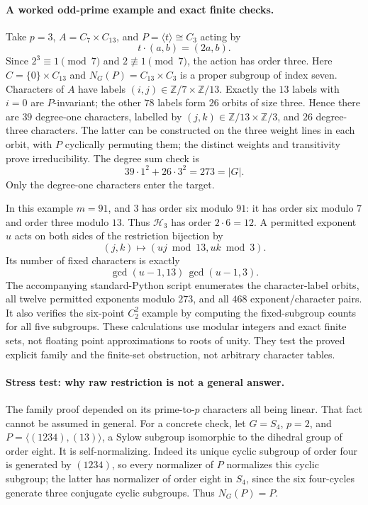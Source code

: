 \documentclass[11pt]{article}
\begin{document}
\paragraph{A worked odd-prime example and exact finite checks.}
Take $p=3$, $A=C_7\times C_{13}$, and $P=\langle t\rangle\cong C_3$
acting by
\[
 t\cdot(a,b)=(2a,b).
\]
Since $2^3\equiv1\pmod7$ and $2\not\equiv1\pmod7$, the action
has order three. Here $C=\{0\}\times C_{13}$ and
$N_G(P)=C_{13}\times C_3$ is a proper subgroup of index seven.
Characters of $A$ have labels $(i,j)\in\mathbb Z/7\times\mathbb Z/13$.
Exactly the $13$ labels with $i=0$ are $P$-invariant; the other $78$
labels form $26$ orbits of size three. Hence there are $39$ degree-one
characters, labelled by $(j,k)\in\mathbb Z/13\times\mathbb Z/3$,
and $26$ degree-three characters. The latter can be constructed on the
three weight lines in each orbit, with $P$ cyclically permuting them;
the distinct weights and transitivity prove irreducibility. The degree
sum check is
\[
 39\cdot1^2+26\cdot3^2=273=|G|.
\]
Only the degree-one characters enter the target.

In this example $m=91$, and $3$ has order six modulo $91$: it has
order six modulo $7$ and order three modulo $13$. Thus $\mathcal H_3$
has order $2\cdot6=12$. A permitted exponent $u$ acts on both sides
of the restriction bijection by
\[
 (j,k)\longmapsto(uj\bmod13,uk\bmod3).
\]
Its number of fixed characters is exactly
\begin{equation}\label{ra495:examplefixed}
 \gcd(u-1,13)\,\gcd(u-1,3).
\end{equation}
The accompanying standard-Python script enumerates the character-label
orbits, all twelve permitted exponents modulo $273$, and all $468$
exponent/character pairs. It also verifies the six-point $C_2^2$ example
by computing the fixed-subgroup counts for all five subgroups. These
calculations use modular integers and exact finite sets, not floating
point approximations to roots of unity. They test the proved explicit
family and the finite-set obstruction, not arbitrary character tables.

\paragraph{Stress test: why raw restriction is not a general answer.}
The family proof depended on its prime-to-$p$ characters all being linear.
That fact cannot be assumed in general. For a concrete check, let
$G=S_4$, $p=2$, and
$P=\langle(1234),(13)\rangle$, a Sylow subgroup isomorphic to the
dihedral group of order eight. It is self-normalizing. Indeed its unique
cyclic subgroup of order four is generated by $(1234)$, so every
normalizer of $P$ normalizes this cyclic subgroup; the latter has
normalizer of order eight in $S_4$, since the six four-cycles generate
three conjugate cyclic subgroups. Thus $N_G(P)=P$.
\end{document}
